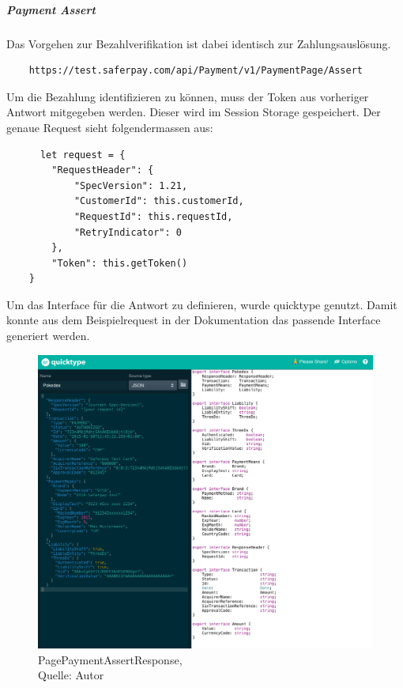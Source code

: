 \subparagraph{Payment Assert}
Das Vorgehen zur Bezahlverifikation ist dabei identisch zur Zahlungsauslösung. 
\begin{verbatim}
	https://test.saferpay.com/api/Payment/v1/PaymentPage/Assert
\end{verbatim}
Um die Bezahlung identifizieren zu können, muss der Token aus vorheriger Antwort mitgegeben werden. Dieser wird im Session Storage gespeichert. 
Der genaue Request sieht folgendermassen aus: 
\begin{verbatim}
	  let request = {
		"RequestHeader": {
			"SpecVersion": 1.21,
			"CustomerId": this.customerId,
			"RequestId": this.requestId,
			"RetryIndicator": 0
		},
		"Token": this.getToken()
	}
\end{verbatim}
Um das Interface für die Antwort zu definieren, wurde quicktype genutzt. Damit konnte aus dem Beispielrequest in der Dokumentation das passende Interface generiert werden. 
\begin{figure}[H]
	\centering
	\includegraphics[width=1\textwidth]{images/quickType.PNG}
	\caption[PagePaymentAssertResponse]{PagePaymentAssertResponse,\\ Quelle: Autor}
	\label{img: PagePaymentAssertResponse}
\end{figure} 

